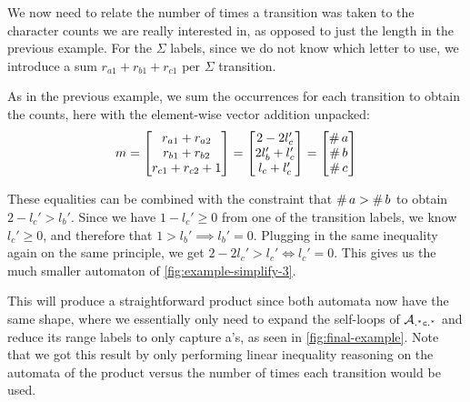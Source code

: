 \documentclass[acmsmall,review,anonymous,screen]{acmart}\settopmatter{printfolios=true,printccs=false,printacmref=true}
\theoremstyle{definition}
\begin{document}
  We now need to relate the number of times a transition was taken to the
  character counts we are really interested in, as opposed to just the length in
  the previous example. For the $\Sigma$ labels, since we do not know which
  letter to use, we introduce a sum $r_{a1} + r_{b1} + r_{c1}$ per $\Sigma$
  transition.

  As in the previous example, we sum the occurrences for each transition to
  obtain the counts, here with the element-wise vector addition unpacked:
  \[
m =   \begin{bmatrix}
  r_{a1} + r_{a2} \\
  r_{b1} + r_{b2} \\
  r_{c1} + r_{c2} + 1 \\
  \end{bmatrix} =
  \begin{bmatrix}
    2 -2l_c' \\
    2l_b' + l_c' \\
    l_c + l_c' \\
    \end{bmatrix} =
    \begin{bmatrix}
      \operatorname{\#}{a} \\
      \operatorname{\#}{b} \\
      \operatorname{\#}{c}
      \end{bmatrix}
  \]
  
These equalities can be combined with the constraint that $\operatorname{\#}{a} >
\operatorname{\#}{b}$ to obtain $2 - l_c' > l_b'$. Since we have $1-l_c' \geq 0$
from one of the transition labels, we know $l_c' \geq 0$, and therefore that $1
> l_b' \implies l_b' = 0$. Plugging in the same inequality again on the same
principle, we get $2 - 2l_c' > l_c' \iff l_c' = 0$. This gives us the much
smaller automaton of \cref{fig:example-simplify-3}.


This will produce a straightforward product since both automata now have the
same shape, where we essentially only need to expand the self-loops of
$\mathcal{A}_{\mathtt{.^\ast{}c.^\ast}}$ and reduce its range labels to only capture a's, as seen
in \cref{fig:final-example}. Note that we got this result by only performing
linear inequality reasoning on the automata of the product versus the number of
times each transition would be used.
\end{document}
